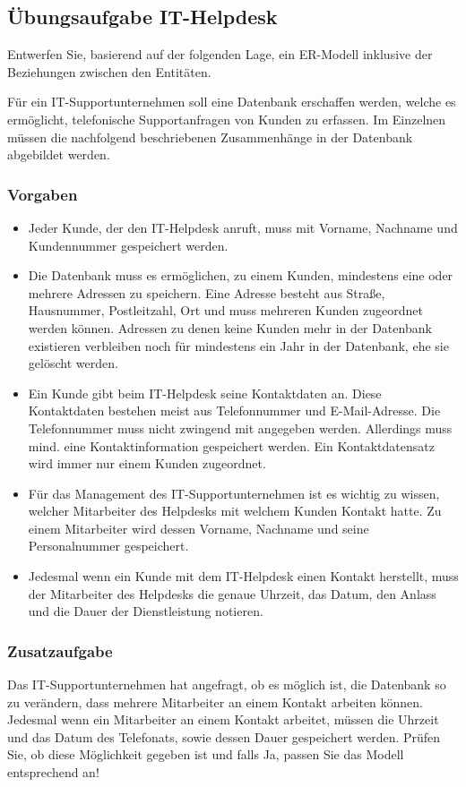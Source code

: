 \subsection{Übungsaufgabe IT-Helpdesk}
Entwerfen Sie, basierend auf der folgenden Lage, ein ER-Modell inklusive der Beziehungen zwischen den Entitäten.

Für ein IT-Supportunternehmen soll eine Datenbank erschaffen werden, welche es ermöglicht, telefonische Supportanfragen von Kunden zu erfassen. Im Einzelnen müssen die nachfolgend beschriebenen Zusammenhänge in der Datenbank abgebildet werden.

\subsubsection{Vorgaben}
\begin{itemize}
    \item Jeder Kunde, der den IT-Helpdesk anruft, muss mit Vorname, Nachname und Kundennummer
          gespeichert werden.
    \item Die Datenbank muss es ermöglichen, zu einem Kunden, mindestens eine oder mehrere
          Adressen zu speichern. Eine Adresse besteht aus Straße, Hausnummer, Postleitzahl, Ort und muss mehreren Kunden zugeordnet werden können. Adressen zu denen keine Kunden mehr
          in der Datenbank existieren verbleiben noch für mindestens ein Jahr in der Datenbank, ehe
          sie gelöscht werden.
    \item Ein Kunde gibt beim IT-Helpdesk seine Kontaktdaten an. Diese Kontaktdaten bestehen
          meist aus Telefonnummer und E-Mail-Adresse. Die Telefonnummer muss nicht zwingend mit angegeben werden. Allerdings muss mind. eine Kontaktinformation gespeichert werden. Ein Kontaktdatensatz wird immer nur einem Kunden zugeordnet.
    \item Für das Management des IT-Supportunternehmen  ist es wichtig zu wissen, welcher
          Mitarbeiter des Helpdesks mit welchem Kunden Kontakt hatte. Zu einem Mitarbeiter wird dessen
          Vorname, Nachname und seine Personalnummer gespeichert.
    \item Jedesmal wenn ein Kunde mit dem IT-Helpdesk einen Kontakt herstellt, muss der
          Mitarbeiter des Helpdesks die genaue Uhrzeit, das Datum, den Anlass und die Dauer der
          Dienstleistung notieren.
\end{itemize}
\subsubsection{Zusatzaufgabe}
Das IT-Supportunternehmen hat angefragt, ob es möglich ist, die Datenbank so zu verändern,
dass mehrere Mitarbeiter an einem Kontakt arbeiten können. Jedesmal wenn ein Mitarbeiter an
einem Kontakt arbeitet, müssen die Uhrzeit und das Datum des Telefonats, sowie dessen Dauer
gespeichert werden. Prüfen Sie, ob diese Möglichkeit gegeben ist und falls Ja, passen Sie das Modell
entsprechend an!
\clearpage